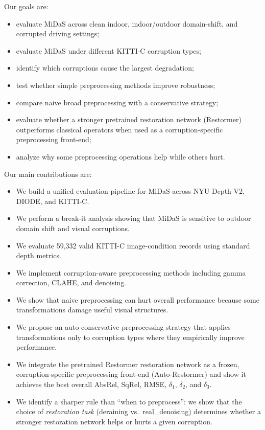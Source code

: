 \documentclass[10pt]{article}
\begin{document}
Our goals are:
\begin{itemize}[leftmargin=*]
    \item evaluate MiDaS across clean indoor, indoor/outdoor domain-shift, and corrupted driving settings;
    \item evaluate MiDaS under different KITTI-C corruption types;
    \item identify which corruptions cause the largest degradation;
    \item test whether simple preprocessing methods improve robustness;
    \item compare naive broad preprocessing with a conservative strategy;
    \item evaluate whether a stronger pretrained restoration network (Restormer) outperforms classical operators when used as a corruption-specific preprocessing front-end;
    \item analyze why some preprocessing operations help while others hurt.
\end{itemize}

Our main contributions are:
\begin{itemize}[leftmargin=*]
    \item We build a unified evaluation pipeline for MiDaS across NYU Depth V2, DIODE, and KITTI-C.
    \item We perform a break-it analysis showing that MiDaS is sensitive to outdoor domain shift and visual corruptions.
    \item We evaluate 59,332 valid KITTI-C image-condition records using standard depth metrics.
    \item We implement corruption-aware preprocessing methods including gamma correction, CLAHE, and denoising.
    \item We show that naive preprocessing can hurt overall performance because some transformations damage useful visual structures.
    \item We propose an auto-conservative preprocessing strategy that applies transformations only to corruption types where they empirically improve performance.
    \item We integrate the pretrained Restormer restoration network as a frozen, corruption-specific preprocessing front-end (Auto-Restormer) and show it achieves the best overall AbsRel, SqRel, RMSE, $\delta_1$, $\delta_2$, and $\delta_3$.
    \item We identify a sharper rule than ``when to preprocess'': we show that the choice of \emph{restoration task} (deraining vs.\ real\_denoising) determines whether a stronger restoration network helps or hurts a given corruption.
\end{itemize}
\end{document}
